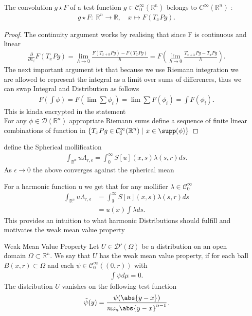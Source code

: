 \begin{lemma}[2.12]
 The convolution $g \star F$ of a test function $g \in  \mathcal{C}_0^{\infty}(\mathbb{R}^{n} ) $ belongs to $C^{\infty}(\mathbb{R}^{n} ) $ : 
 \begin{align*}
  g \star F : \ \mathbb{R}^{n}  \to  \mathbb{R} , \quad x \mapsto F(T_xPg)
 .\end{align*}
\end{lemma}
\begin{proof}
 The continuity argument works by realising that since F is continuous and linear  
 \begin{align*}
   \frac{\partial }{\partial x_i} F(T_xPg) = \lim_{h\to 0} \frac{F(T_{x+h}Pg) - F(T_xPg)}{h} =  F(\lim_{h\to 0} \frac{T_{x+h}Pg - T_xPg}{h})
 .\end{align*}
 The next important argument ist that because we use Riemann integration we are allowed to represent the integral as a limit over sums of  differences, thus we can swap Integral and Distribution as follows 
 \begin{align*}
  F(\int  \phi ) = F(\lim \sum \phi_i) = \lim \sum F(\phi_i ) = \int F(\phi_i )
 .\end{align*}
 This is kinda encrypted in the statement \\[1ex]
 For any $\phi  \in  \mathcal{D}(\mathbb{R}^{n} )$ appropriate Riemann sums define a sequence of finite linear combinations of function in $\{T_xPg \in  \mathcal{C}_0^{\infty}(\mathbb{R}^{n}) \ | \ x \in  \supp(\phi ) \}  $
\end{proof}
\begin{definition}
 define the Spherical mollification 
 \begin{align*}
   \int_{\mathbb{R}^{n} } u \Lambda_{r,\epsilon } = \int_0^{\infty} S[u](x,s) \lambda(s,r)ds 
 .\end{align*}
 As $\epsilon  \to 0$ the above converges against the spherical mean 
\end{definition}
For a harmonic function u we get that for any mollifier $\lambda \in  \mathcal{C}^{\infty}_0 $
\begin{align*}
  \int_{\mathbb{R}^{n} } u \Lambda_{r,\epsilon } &= \int_0^{\infty} S[u](x,s) \lambda(s,r)ds \\
                                                 &= u(x) \int \lambda  ds
.\end{align*}
This provides an intuition to what harmonic Distributions should fulfill and motivates the weak mean value property
\begin{theorem}{Weak Mean Value Property}
 Let $U \in  \mathcal{D}'(\Omega )$  be a distribution on an open domain $\Omega  \subset  \mathbb{R}^{n} $. We 
 say that $U$ has the weak mean value property, if for each ball $B(x,r) \subset  \Omega $ and each $\psi \in  \mathcal{C}^{\infty}_0((0,r)) $ with 
 \begin{align*}
  \int \psi d \mu  =  0
 .\end{align*}
 The distribution  $U$ vanishes on the following test function 
 \begin{align*}
  \tilde{\psi} (y) = \frac{\psi(\abs{y-x})}{n\omega_n \abs{y-x}^{n-1} }
 .\end{align*}
\end{theorem}
